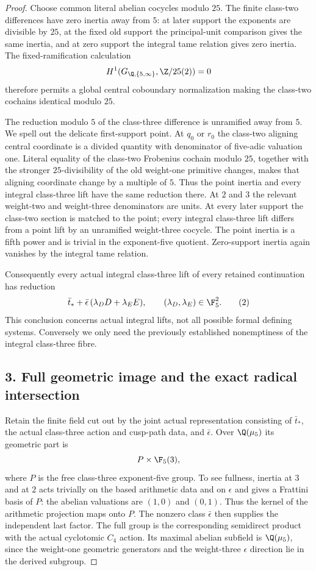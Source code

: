 \begin{proof}
Choose common literal abelian cocycles modulo $25$. The finite class-two differences have zero inertia away from $5$: at later support the exponents are divisible by $25$, at the fixed old support the principal-unit comparison gives the same inertia, and at zero support the integral tame relation gives zero inertia. The fixed-ramification calculation
\[
 H^1(G_{\Q,\{5,\infty\}},\Z/25(2))=0
\]
therefore permits a global central coboundary normalization making the class-two cochains identical modulo $25$.

The reduction modulo $5$ of the class-three difference is unramified away from $5$. We spell out the delicate first-support point. At $q_0$ or $r_0$ the class-two aligning central coordinate is a divided quantity with denominator of five-adic valuation one. Literal equality of the class-two Frobenius cochain modulo $25$, together with the stronger $25$-divisibility of the old weight-one primitive changes, makes that aligning coordinate change by a multiple of $5$. Thus the point inertia and every integral class-three lift have the same reduction there. At $2$ and $3$ the relevant weight-two and weight-three denominators are units. At every later support the class-two section is matched to the point; every integral class-three lift differs from a point lift by an unramified weight-three cocycle. The point inertia is a fifth power and is trivial in the exponent-five quotient. Zero-support inertia again vanishes by the integral tame relation.

Consequently every actual integral class-three lift of every retained continuation has reduction
\[
 \bar t_*+\bar\epsilon\,(\lambda_DD+\lambda_EE),
 \qquad (\lambda_D,\lambda_E)\in\F_5^2.
 \tag{2}
\]
This conclusion concerns actual integral lifts, not all possible formal defining systems. Conversely we only need the previously established nonemptiness of the integral class-three fibre.

\subsection*{3. Full geometric image and the exact radical intersection}
Retain the finite field cut out by the joint actual representation consisting of $\bar t_*$, the actual class-three action and cusp-path data, and $\bar\epsilon$. Over $\Q(\mu_5)$ its geometric part is
\[
 P\times\F_5(3),
\]
where $P$ is the free class-three exponent-five group. To see fullness, inertia at $3$ and at $2$ acts trivially on the based arithmetic data and on $\epsilon$ and gives a Frattini basis of $P$: the abelian valuations are $(1,0)$ and $(0,1)$. Thus the kernel of the arithmetic projection maps onto $P$. The nonzero class $\bar\epsilon$ then supplies the independent last factor. The full group is the corresponding semidirect product with the actual cyclotomic $C_4$ action. Its maximal abelian subfield is $\Q(\mu_5)$, since the weight-one geometric generators and the weight-three $\epsilon$ direction lie in the derived subgroup.


\end{proof}
